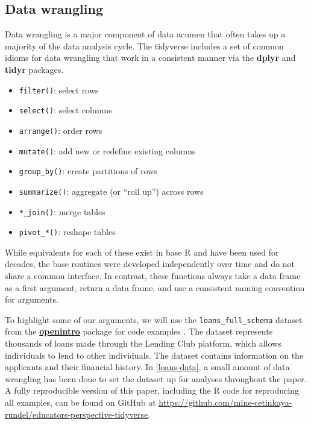 \documentclass[12pt]{article}
\providecommand{\tightlist}{%
  \setlength{\itemsep}{0pt}\setlength{\parskip}{0pt}}
\newcommand{\github}[1]{\href{https://github.com/mine-cetinkaya-rundel/educators-perspective-tidyverse}{https://github.com/mine-cetinkaya-rundel/educators-perspective-tidyverse}}
\begin{document}
\hypertarget{sec:wrangle}{%
\subsection{Data wrangling}\label{sec:wrangle}}

Data wrangling is a major component of data acumen \citep{nasem2018}
that often takes up a majority of the data analysis cycle. The tidyverse
includes a set of common idioms for data wrangling that work in a
consistent manner via the \textbf{dplyr} and \textbf{tidyr} packages.

\begin{itemize}
\tightlist
\item
  \texttt{filter()}: select rows
\item
  \texttt{select()}: select columns
\item
  \texttt{arrange()}: order rows
\item
  \texttt{mutate()}: add new or redefine existing columns
\item
  \texttt{group\_by()}: create partitions of rows
\item
  \texttt{summarize()}: aggregate (or ``roll up'') across rows
\item
  \texttt{*\_join()}: merge tables
\item
  \texttt{pivot\_*()}: reshape tables
\end{itemize}

While equivalents for each of these exist in base R and have been used
for decades, the base routines were developed independently over time
and do not share a common interface. In contrast, these functions always
take a data frame as a first argument, return a data frame, and use a
consistent naming convention for arguments.

To highlight some of our arguments, we will use the
\texttt{loans\_full\_schema} dataset from the
\href{http://openintrostat.github.io/openintro/index.html}{\textbf{openintro}}
package for code examples \citep{R-openintro}. The dataset represents
thousands of loans made through the Lending Club platform, which allows
individuals to lend to other individuals. The dataset contains
information on the applicants and their financial history. In
\ref{loans-data}, a small amount of data wrangling has been done to set
the dataset up for analyses throughout the paper. A fully reproducible
version of this paper, including the R code for reproducing all
examples, can be found on GitHub at \github{}.

\linespread{1}
\end{document}
